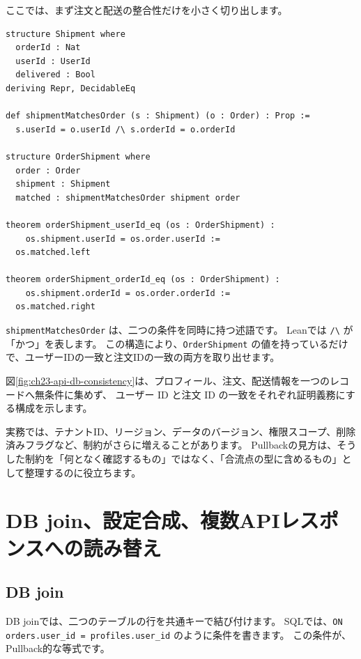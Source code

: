 ここでは、まず注文と配送の整合性だけを小さく切り出します。

\begin{listing}[htbp]
\begin{verbatim}
structure Shipment where
  orderId : Nat
  userId : UserId
  delivered : Bool
deriving Repr, DecidableEq

def shipmentMatchesOrder (s : Shipment) (o : Order) : Prop :=
  s.userId = o.userId /\ s.orderId = o.orderId

structure OrderShipment where
  order : Order
  shipment : Shipment
  matched : shipmentMatchesOrder shipment order

theorem orderShipment_userId_eq (os : OrderShipment) :
    os.shipment.userId = os.order.userId :=
  os.matched.left

theorem orderShipment_orderId_eq (os : OrderShipment) :
    os.shipment.orderId = os.order.orderId :=
  os.matched.right
\end{verbatim}
\caption{\texttt{OrderShipment}}
\label{lst:ch23-order-shipment}
\end{listing}

\texttt{shipmentMatchesOrder} は、二つの条件を同時に持つ述語です。
Leanでは \verb|/\| が「かつ」を表します。
この構造により、\texttt{OrderShipment} の値を持っているだけで、ユーザーIDの一致と注文IDの一致の両方を取り出せます。

図\ref{fig:ch23-api-db-consistency}は、プロフィール、注文、配送情報を一つのレコードへ無条件に集めず、
ユーザー ID と注文 ID の一致をそれぞれ証明義務にする構成を示します。


実務では、テナントID、リージョン、データのバージョン、権限スコープ、削除済みフラグなど、制約がさらに増えることがあります。
Pullbackの見方は、そうした制約を「何となく確認するもの」ではなく、「合流点の型に含めるもの」として整理するのに役立ちます。

\section{DB join、設定合成、複数APIレスポンスへの読み替え}

\subsection{DB join}

DB joinでは、二つのテーブルの行を共通キーで結び付けます。
SQLでは、\texttt{ON orders.user\_id = profiles.user\_id} のように条件を書きます。
この条件が、Pullback的な等式です。

